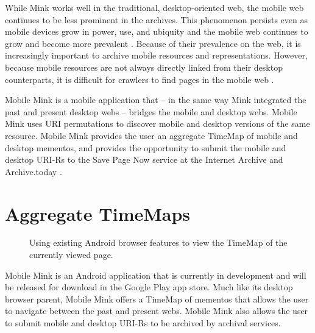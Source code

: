 \documentclass{sig-alternate-2013}
\begin{document}
While Mink works well in the traditional, desktop-oriented web, the mobile web continues to be less prominent in the archives. This phenomenon persists even as mobile devices grow in power, use, and ubiquity and the mobile web continues to grow and become more prevalent \cite{mobileWeb}. Because of their prevalence on the web, it is increasingly important to archive mobile resources and representations. However, because mobile resources are not always directly linked from their desktop counterparts, it is difficult for crawlers to find pages in the mobile web \cite{4544648}.

Mobile Mink is a mobile application that -- in the same way Mink integrated the past and present desktop webs -- bridges the mobile and desktop webs. Mobile Mink uses URI permutations to discover mobile and desktop versions of the same resource. Mobile Mink provides the user an aggregate TimeMap of mobile and desktop mementos, and provides the opportunity to submit the mobile and desktop URI-Rs to the Save Page Now service at the Internet Archive \cite{savePage} and Archive.today \cite{archivetoday}.


\section{Aggregate TimeMaps}
\label{timemaps}

\begin{figure*}
    \qquad
      \qquad
      \qquad
  \caption{Using existing Android browser features to view the TimeMap of the currently viewed page.}
  \label{clicks}
\end{figure*}

Mobile Mink is an Android application that is currently in development and will be released for download in the Google Play app store.
Much like its desktop browser parent, Mobile Mink offers a TimeMap of mementos that allows the user to navigate between the past and present webs. Mobile Mink also allows the user to submit mobile and desktop URI-Rs to be archived by archival services.
\end{document}
